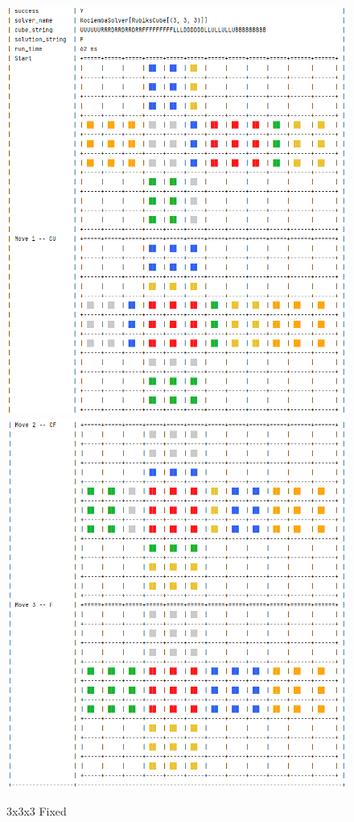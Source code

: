 \begin{figure}[H]
\centering
\includegraphics[scale=0.5]{./Figures/KociembaBug333Fix1}
%
\includegraphics[scale=0.5]{./Figures/KociembaBug333Fix2}
\caption[Kociemba Bug Fix]{3x3x3 Fixed}
\label{fig:KociembaBug333Fix}
\end{figure}











